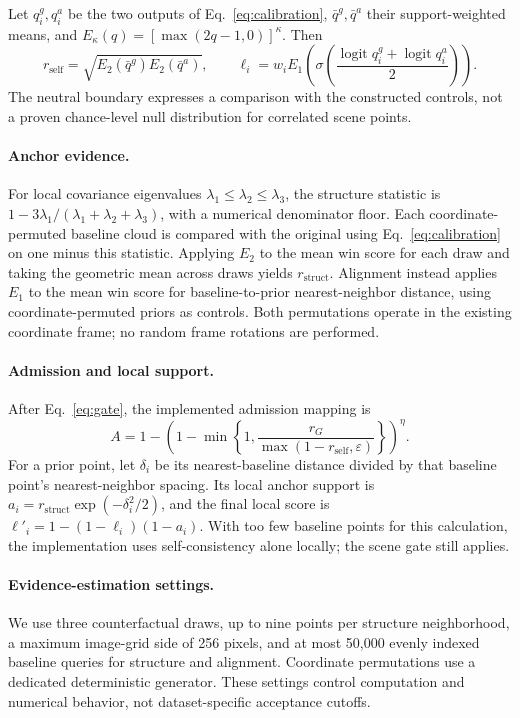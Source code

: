 \documentclass{article}
\newcommand{\rself}{r_{\mathrm{self}}}
\newcommand{\rstruct}{r_{\mathrm{struct}}}
\DeclareMathOperator{\logit}{logit}
\begin{document}
Let $q_i^g,q_i^a$ be the two outputs of Eq.~\eqref{eq:calibration}, $\bar q^g,\bar q^a$ their support-weighted means, and $E_\kappa(q)=[\max(2q-1,0)]^\kappa$. Then
\begin{equation}
\rself=\sqrt{E_2(\bar q^g)E_2(\bar q^a)},\qquad
\ell_i=w_i E_1\!\left(
\sigma\!\left(\frac{\logit q_i^g+\logit q_i^a}{2}\right)\right).
\label{eq:local}
\end{equation}
The neutral boundary expresses a comparison with the constructed controls, not a proven chance-level null distribution for correlated scene points.

\paragraph{Anchor evidence.}
For local covariance eigenvalues $\lambda_1\le\lambda_2\le\lambda_3$, the structure statistic is $1-3\lambda_1/(\lambda_1+\lambda_2+\lambda_3)$, with a numerical denominator floor. Each coordinate-permuted baseline cloud is compared with the original using Eq.~\eqref{eq:calibration} on one minus this statistic. Applying $E_2$ to the mean win score for each draw and taking the geometric mean across draws yields $\rstruct$. Alignment instead applies $E_1$ to the mean win score for baseline-to-prior nearest-neighbor distance, using coordinate-permuted priors as controls. Both permutations operate in the existing coordinate frame; no random frame rotations are performed.

\paragraph{Admission and local support.}
After Eq.~\eqref{eq:gate}, the implemented admission mapping is
\begin{equation}
A=1-\left(1-\min\left\{1,
\frac{r_G}{\max(1-\rself,\varepsilon)}\right\}\right)^\eta.
\label{eq:admission}
\end{equation}
For a prior point, let $\delta_i$ be its nearest-baseline distance divided by that baseline point's nearest-neighbor spacing. Its local anchor support is $a_i=\rstruct\exp(-\delta_i^2/2)$, and the final local score is $\ell'_i=1-(1-\ell_i)(1-a_i)$. With too few baseline points for this calculation, the implementation uses self-consistency alone locally; the scene gate still applies.

\paragraph{Evidence-estimation settings.}
We use three counterfactual draws, up to nine points per structure neighborhood, a maximum image-grid side of 256 pixels, and at most 50,000 evenly indexed baseline queries for structure and alignment. Coordinate permutations use a dedicated deterministic generator. These settings control computation and numerical behavior, not dataset-specific acceptance cutoffs.
\end{document}
